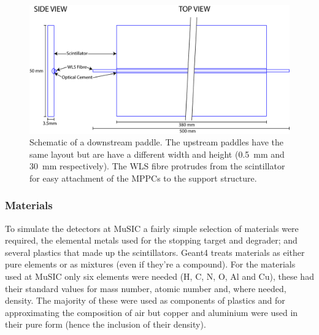 \begin{figure}[hptb]
  \centering
    \includegraphics[width=.9\textwidth]{images/counter_schematic.png}
  \caption{Schematic of a downstream paddle. The upstream paddles have the same layout but are have a different width and height (0.5~mm and 30~mm respectively). The WLS fibre protrudes from the scintillator for easy attachment of the MPPCs to the support structure.}
  \label{fig:images_counter_schematic}
\end{figure}


\subsubsection{Materials} %
\label{ssub:implementation_materials}

To simulate the detectors at MuSIC a fairly simple selection of materials were required, the elemental metals used for the stopping target and degrader; and several plastics that made up the scintillators. Geant4 treats materials as either pure elements or as mixtures (even if they're a compound). For the materials used at MuSIC only six elements were needed (H, C, N, O, Al and Cu), these had their standard values for mass number, atomic number and, where needed, density. The majority of these were used as components of plastics and for approximating the composition of air but copper and aluminium were used in their pure form (hence the inclusion of their density). 

